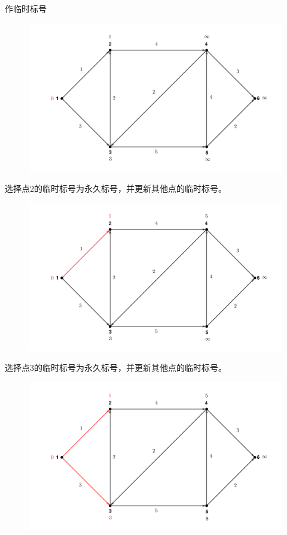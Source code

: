 \documentclass[lang = cn, scheme = chinese, thmcnt = section]{elegantbook}
\begin{document}
\begin{solution}
	作临时标号
	\begin{figure}[H]
		\centering
		\includegraphics[scale = 0.15]{../图/13.1.2}
	\end{figure}
	
	选择点$2$的临时标号为永久标号，并更新其他点的临时标号。
	\begin{figure}[H]
		\centering
		\includegraphics[scale = 0.15]{../图/13.1.3}
	\end{figure}
	
	选择点$3$​的临时标号为永久标号，并更新其他点的临时标号。
	\begin{figure}[H]
		\centering
		\includegraphics[scale = 0.15]{../图/13.1.4}
	\end{figure}
	

\end{solution}
\end{document}
